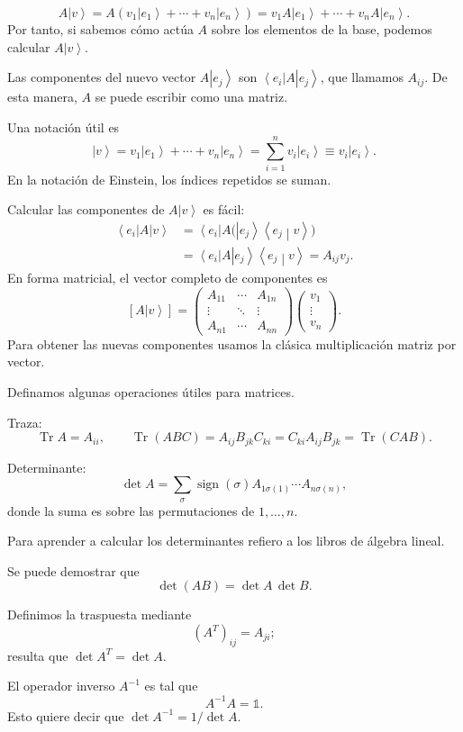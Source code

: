 \documentclass[11pt,a4paper]{article}
\newcommand{\concept}[1]{\textcolor{concept-green}{#1}}
\newcommand{\ket}[1]{\left|#1\right\rangle}
\newcommand{\bra}[1]{\left\langle#1\right|}
\newcommand{\braket}[2]{\left\langle #1\middle|#2\right\rangle}
\newcommand{\Tr}{\operatorname{Tr}}
\begin{document}
\[
  A\ket v=A(v_1\ket{e_1}+\cdots+v_n\ket{e_n})
  =v_1A\ket{e_1}+\cdots+v_nA\ket{e_n}.
\]
Por tanto, si sabemos cómo actúa $A$ sobre los elementos de la base, podemos calcular $A\ket v$.

Las componentes del nuevo vector $A\ket{e_j}$ son $\bra{e_i}A\ket{e_j}$, que llamamos $A_{ij}$. De esta manera, $A$ se puede escribir como una matriz.

Una notación útil es
\[
  \ket v=v_1\ket{e_1}+\cdots+v_n\ket{e_n}
  =\sum_{i=1}^n v_i\ket{e_i}\equiv v_i\ket{e_i}.
\]
En la \concept{notación de Einstein}, los índices repetidos se suman.

Calcular las componentes de $A\ket v$ es fácil:
\begin{align*}
  \bra{e_i}A\ket v
  &=\bra{e_i}A\bigl(\ket{e_j}\braket{e_j}{v}\bigr)\\
  &=\bra{e_i}A\ket{e_j}\braket{e_j}{v}
   =A_{ij}v_j.
\end{align*}
En forma matricial, el vector completo de componentes es
\[
  [A\ket v]=
   \begin{pmatrix}
     A_{11}&\cdots&A_{1n}\\
     \vdots&\ddots&\vdots\\
     A_{n1}&\cdots&A_{nn}
   \end{pmatrix}
   \begin{pmatrix}v_1\\ \vdots\\ v_n\end{pmatrix}.
\]
Para obtener las nuevas componentes usamos la clásica multiplicación matriz por vector.

Definamos algunas operaciones útiles para matrices.

\concept{Traza}:
\[
  \Tr A=A_{ii},
  \qquad
  \Tr(ABC)=A_{ij}B_{jk}C_{ki}=C_{ki}A_{ij}B_{jk}=\Tr(CAB).
\]

\concept{Determinante}:
\[
  \det A=\sum_{\sigma}\operatorname{sign}(\sigma)
  A_{1\sigma(1)}\cdots A_{n\sigma(n)},
\]
donde la suma es sobre las permutaciones de $1,\ldots,n$.

Para aprender a calcular los determinantes refiero a los libros de álgebra lineal.

Se puede demostrar que
\[
  \det(AB)=\det A\,\det B.
\]

Definimos la \concept{traspuesta} mediante
\[
  (A^T)_{ij}=A_{ji};
\]
resulta que $\det A^T=\det A$.

El operador \concept{inverso} $A^{-1}$ es tal que
\[
  A^{-1}A=\mathbb{1}.
\]
Esto quiere decir que $\det A^{-1}=1/\det A$.
\end{document}

